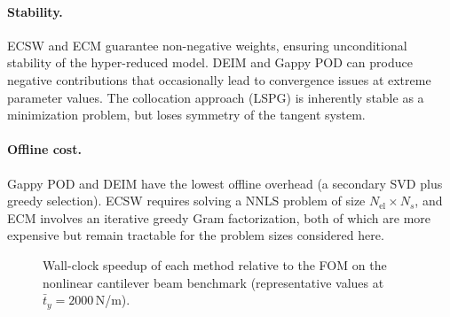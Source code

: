 \paragraph{Stability.}
ECSW and ECM guarantee non-negative weights, ensuring unconditional stability of the hyper-reduced model. DEIM and Gappy POD can produce negative contributions that occasionally lead to convergence issues at extreme parameter values. The collocation approach (LSPG) is inherently stable as a minimization problem, but loses symmetry of the tangent system.

\paragraph{Offline cost.}
Gappy POD and DEIM have the lowest offline overhead (a secondary SVD plus greedy selection). ECSW requires solving a NNLS problem of size $N_{\text{el}} \times N_s$, and ECM involves an iterative greedy Gram factorization, both of which are more expensive but remain tractable for the problem sizes considered here.

\begin{figure}[H]
\centering
{}
\caption{Wall-clock speedup of each method relative to the FOM on the nonlinear cantilever beam benchmark (representative values at $\bar{t}_y = 2000$\,N/m).}
\label{fig:speedup-bar}
\end{figure}

